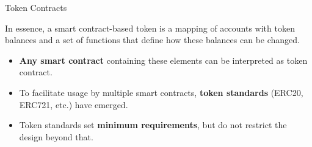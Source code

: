 \documentclass[handout]{beamer}
\begin{document}
\begin{frame}{Token Contracts}

\begin{minipage}{0.35\textwidth}
	\begin{tikzpicture}[scale=1.0, every node/.style={scale=1.0}]
			
	\end{tikzpicture}
\end{minipage}
\begin{minipage}{0.6\textwidth}
			In essence, a smart contract-based token is \color{focus}a mapping \color{black}of accounts with token balances and a \color{focus} set of functions \color{black} that define how these balances can be changed.  
\end{minipage}

\vspace{2 em}

\begin{itemize}
	\item<2-> \textbf{Any smart contract} containing these elements can be interpreted as token contract.
	\item<3-> To facilitate usage by multiple smart contracts, \textbf{token standards} (ERC20, ERC721, etc.) have emerged.
	\item<4-> Token standards set \textbf{minimum requirements}, but do not restrict the design beyond that. 
\end{itemize}	
	

\end{frame}
\end{document}
